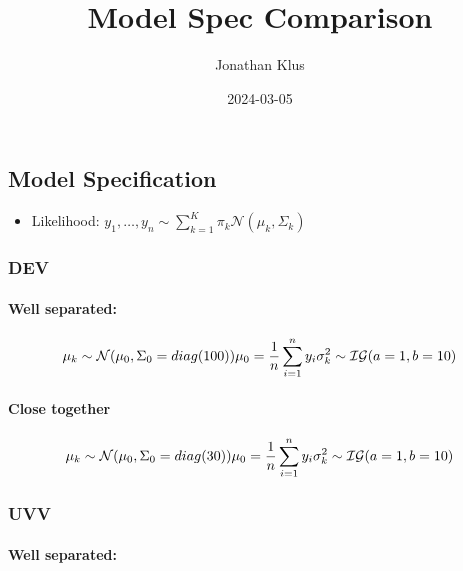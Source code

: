 \documentclass[
]{article}
\title{Model Spec Comparison}
\author{Jonathan Klus}
\date{2024-03-05}
\providecommand{\tightlist}{%
  \setlength{\itemsep}{0pt}\setlength{\parskip}{0pt}}
\begin{document}
\maketitle

\hypertarget{model-specification}{%
\subsection{Model Specification}\label{model-specification}}

\begin{itemize}
\tightlist
\item
  Likelihood:
  \(y_1, \dots, y_n \sim \sum_{k=1}^{K} \pi_k \mathcal{N}(\mu_k, \Sigma_k)\)
\end{itemize}

\hypertarget{dev}{%
\subsubsection{DEV}\label{dev}}

\hypertarget{well-separated}{%
\paragraph{Well separated:}\label{well-separated}}

\[
  \mu_k \sim \mathcal{N}(\mu_0, \Sigma_0 = diag(100))\\
  \mu_0 = \frac{1}{n}\sum_{i=1}^{n}y_i\\
  \sigma^2_k \sim \mathcal{IG}(a = 1, b = 10)
  \]

\hypertarget{close-together}{%
\paragraph{Close together}\label{close-together}}

\[
  \mu_k \sim \mathcal{N}(\mu_0, \Sigma_0 = diag(30))\\
  \mu_0 = \frac{1}{n}\sum_{i=1}^{n}y_i\\
  \sigma^2_k \sim \mathcal{IG}(a = 1, b = 10)
  \]

\hypertarget{uvv}{%
\subsubsection{UVV}\label{uvv}}

\hypertarget{well-separated-1}{%
\paragraph{Well separated:}\label{well-separated-1}}
\end{document}

